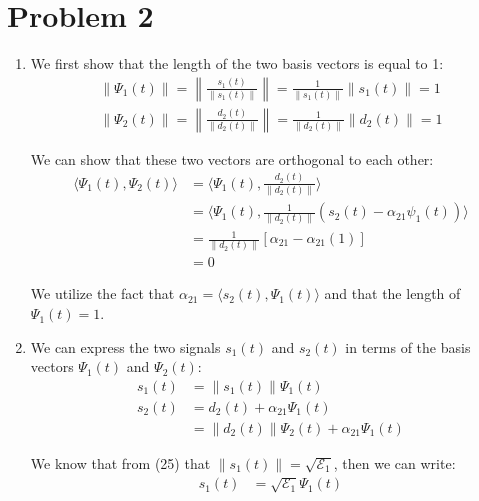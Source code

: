 \documentclass{article}
\begin{document}
\section{Problem 2}
\begin{enumerate}[label=2.\arabic*]
    \item We first show that the length of the two basis vectors is equal to 1:
    \begin{align*}
        \|\Psi_1(t)\| = \left\|\frac{s_1(t)}{\|s_1(t)\|}\right\| = \frac{1}{\|s_1(t)\|}\left\|s_1(t)\right\| = 1 \\
        \|\Psi_2(t)\| = \left\|\frac{d_2(t)}{\|d_2(t)\|}\right\| = \frac{1}{\|d_2(t)\|}\left\|d_2(t)\right\| = 1
    \end{align*}

    We can show that these two vectors are orthogonal to each other:
    \begin{align*}
        \langle \Psi_1(t), \Psi_2(t) \rangle &= \langle \Psi_1(t), \frac{d_2(t)}{\|d_2(t)\|} \rangle \\
        &= \langle \Psi_1(t), \frac{1}{\|d_2(t)\|} (s_2(t) - \alpha_{21}\psi_1(t)) \rangle \\
        &= \frac{1}{\|d_2(t)\|} \left[\alpha_{21} - \alpha_{21}(1)\right] \\
        &= 0
    \end{align*}

    We utilize the fact that $\alpha_{21} = \langle s_2(t), \Psi_1(t) \rangle$ and that the length of $\Psi_1(t) = 1$.

    \item We can express the two signals $s_1(t)$ and $s_2(t)$ in terms of the basis vectors $\Psi_1(t)$ and $\Psi_2(t)$:
    \begin{align*}
        s_1(t) &= \| s_1(t) \| \Psi_1(t) \\
        s_2(t) &= d_2(t) + \alpha_{21} \Psi_1(t) \\
        &= \| d_2(t) \| \Psi_2(t) + \alpha_{21} \Psi_1(t)
    \end{align*}

    We know that from (25) that $\|s_1(t)\| = \sqrt{\mathcal{E}_1}$, then we can write:
    \begin{align*}
        s_1(t) &= \sqrt{\mathcal{E}_1} \Psi_1(t) \\
    \end{align*}


\end{enumerate}
\end{document}
